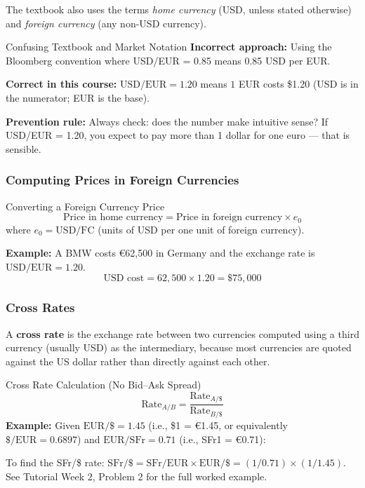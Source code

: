 \documentclass[11pt,a4paper]{article}
\begin{document}
The textbook also uses the terms \textit{home currency} (USD, unless stated otherwise) and \textit{foreign currency} (any non-USD currency).

\begin{mistakebox}{Confusing Textbook and Market Notation}
\textbf{Incorrect approach:} Using the Bloomberg convention where USD/EUR = 0.85 means 0.85 USD per EUR.

\textbf{Correct in this course:} $\text{USD}/\text{EUR} = 1.20$ means $1$ EUR costs \$1.20 (USD is in the numerator; EUR is the base).

\textbf{Prevention rule:} Always check: does the number make intuitive sense? If USD/EUR = 1.20, you expect to pay more than 1 dollar for one euro --- that is sensible.
\end{mistakebox}

\subsubsection{Computing Prices in Foreign Currencies}

\begin{formulabox}{Converting a Foreign Currency Price}
\[
  \text{Price in home currency} = \text{Price in foreign currency} \times e_0
\]
where $e_0 = \text{USD}/\text{FC}$ (units of USD per one unit of foreign currency).

\textbf{Example:} A BMW costs \euro{}62{,}500 in Germany and the exchange rate is $\text{USD}/\text{EUR} = 1.20$.
\[
  \text{USD cost} = 62{,}500 \times 1.20 = \$75{,}000
\]
\end{formulabox}

\subsubsection{Cross Rates}

A \textbf{cross rate} is the exchange rate between two currencies computed using a third currency (usually USD) as the intermediary, because most currencies are quoted against the US dollar rather than directly against each other.

\begin{formulabox}{Cross Rate Calculation (No Bid--Ask Spread)}
\[
  \text{Rate}_{A/B} = \frac{\text{Rate}_{A/\$}}{\text{Rate}_{B/\$}}
\]
\textbf{Example:} Given $\text{EUR}/\$ = 1.45$ (i.e., \$1 = €1.45, or equivalently $\$/\text{EUR} = 0.6897$) and $\text{EUR}/\text{SFr} = 0.71$ (i.e., SFr1 = €0.71):

To find the SFr/\$ rate: $\text{SFr}/\$ = \text{SFr}/\text{EUR} \times \text{EUR}/\$ = (1/0.71) \times (1/1.45)$. See Tutorial Week 2, Problem 2 for the full worked example.
\end{formulabox}
\end{document}
